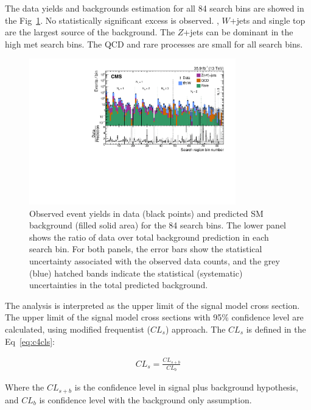 The data yields and backgrounds estimation for all 84 search bins are showed in the Fig~\ref{fig:84sbunblind}. No statistically significant excess is observed. \ttbar, $W$+jets and single top are the largest source of the background. The $Z$+jets can be dominant in the high met search bins. The QCD and rare processes are small for all search bins. 

\begin{figure}[htbp]
 \begin{center}
  \includegraphics[width=0.8\textwidth]{sections/mc4/Results/figures/UnblindPlots.pdf}
 \end{center}
 \caption{Observed event yields in data (black points) and predicted SM background (filled solid area) for the 84 search bins. The lower panel shows the ratio of data over total background prediction in each search bin. For both panels, the error bars show the statistical uncertainty associated with the observed data counts, and the grey (blue) hatched bands indicate the statistical (systematic) uncertainties in the total predicted background.}
 \label{fig:84sbunblind}
\end{figure}

The analysis is interpreted as the upper limit of the signal model cross section. The upper limit of the signal model cross sections with 95\% confidence level are calculated, using modified frequentist ($CL_{s}$) approach\cite{Cowan:2010js}. The $CL_{s}$ is defined in the Eq~\ref{eq:c4cls}:

\begin{equation}
 \begin{aligned}
  CL_{s}=\frac{CL_{s+b}}{CL_{b}}
 \end{aligned}
 \label{eq:c4cls}
\end{equation}

Where the $CL_{s+b}$ is the confidence level in signal plus background hypothesis, and $CL_{b}$ is confidence level with the background only assumption. 

